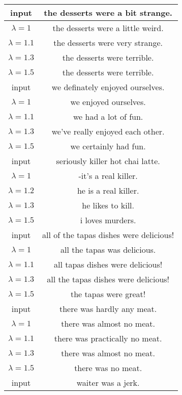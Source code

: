 \begin{table}[ht]
\begin{tabular}[t]{c|c}
\small input	&\small  the desserts were a bit strange. 	\\\hline
\small $\lambda = 1$&	\small 	the desserts were a little weird. 	\\
\small $\lambda = 1.1$	&\small the desserts were very strange. 	\\
\small $\lambda = 1.3$&\small 	the desserts were terrible. \\
\small $\lambda = 1.5$&\small 	the desserts were terrible.
\\
\hline
\small input	&\small  we definately enjoyed ourselves.	\\\hline
\small $\lambda = 1$&	\small we enjoyed ourselves.  	\\
\small $\lambda = 1.1$	&\small we had a lot of fun. 		\\
\small $\lambda = 1.3$&\small 	we've really enjoyed each other. \\
\small $\lambda = 1.5$&\small we certainly had fun. \\
\hline
\small input &\small 	seriously killer hot chai latte. 	\\\hline
\small $\lambda = 1$&\small 	-it's a real killer. 	\\
\small $\lambda = 1.2$	&\small he is a real killer. 	\\
\small $\lambda = 1.3$& \small he likes to kill. 	\\
\small $\lambda = 1.5$	& \small i loves murders. \\
\hline
\small input	&\small all of the tapas dishes were delicious! 	 \\	\hline
\small $\lambda = 1$&\small all the tapas was delicious.  	\\
\small $\lambda = 1.1$\small	&all tapas dishes were delicious!  	\\
\small $\lambda = 1.3$&\small	all the tapas dishes were delicious! 	\\
\small $\lambda = 1.5$\small	&the tapas were great!  	\\
\hline
\small input	&\small  there was hardly any meat. 	 	\\\hline
\small $\lambda = 1$&	\small there was almost no meat. 	\\
\small $\lambda = 1.1$	&\small there was practically no meat. 	\\
\small $\lambda = 1.3$&\small 	there was almost no meat. \\
\small $\lambda = 1.5$&\small 	there was no meat.
\\
\hline
\small input	&\small  waiter was a jerk. 	\\\hline

\end{tabular}
\end{table}
